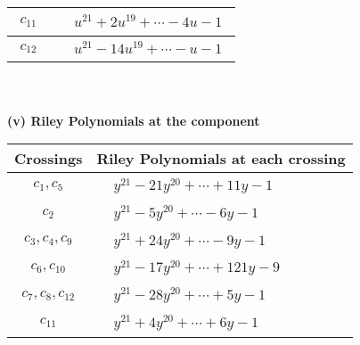 \documentclass[1p]{elsarticle_modified}
\theoremstyle{definition}
\begin{document}
\begin{tabular}{m{50pt}|m{274pt}}
\hline $$\begin{aligned}c_{11}\end{aligned}$$&$\begin{aligned}
&u^{21}+2 u^{19}+\cdots-4 u-1
\end{aligned}$\\
\hline $$\begin{aligned}c_{12}\end{aligned}$$&$\begin{aligned}
&u^{21}-14 u^{19}+\cdots- u-1
\end{aligned}$\\
\hline
\end{tabular}\\~\\
\newpage\renewcommand{\arraystretch}{1}
\flushleft \textbf{(v) Riley Polynomials at the component}\newline \\
\begin{tabular}{m{50pt}|m{274pt}}
Crossings & \hspace{64pt}Riley Polynomials at each crossing \\
\hline $$\begin{aligned}c_{1},c_{5}\end{aligned}$$&$\begin{aligned}
&y^{21}-21 y^{20}+\cdots+11 y-1
\end{aligned}$\\
\hline $$\begin{aligned}c_{2}\end{aligned}$$&$\begin{aligned}
&y^{21}-5 y^{20}+\cdots-6 y-1
\end{aligned}$\\
\hline $$\begin{aligned}c_{3},c_{4},c_{9}\end{aligned}$$&$\begin{aligned}
&y^{21}+24 y^{20}+\cdots-9 y-1
\end{aligned}$\\
\hline $$\begin{aligned}c_{6},c_{10}\end{aligned}$$&$\begin{aligned}
&y^{21}-17 y^{20}+\cdots+121 y-9
\end{aligned}$\\
\hline $$\begin{aligned}c_{7},c_{8},c_{12}\end{aligned}$$&$\begin{aligned}
&y^{21}-28 y^{20}+\cdots+5 y-1
\end{aligned}$\\
\hline $$\begin{aligned}c_{11}\end{aligned}$$&$\begin{aligned}
&y^{21}+4 y^{20}+\cdots+6 y-1
\end{aligned}$\\
\hline
\end{tabular}\\~\\
\end{document}
